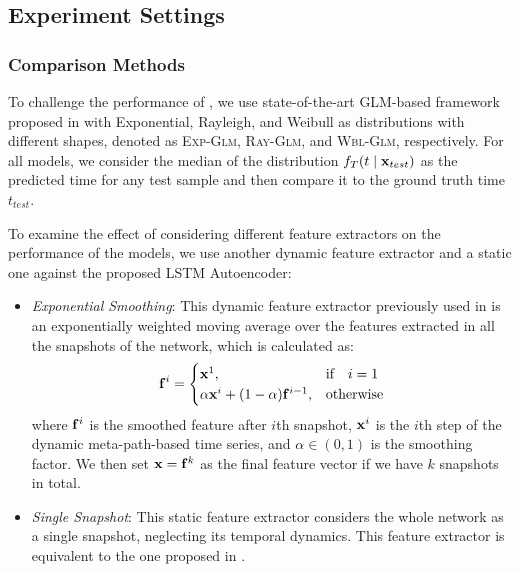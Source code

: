 \subsection{Experiment Settings}
\subsubsection{Comparison Methods}
To challenge the performance of \npglm, we use state-of-the-art GLM-based framework proposed in \cite{sun2012will} with Exponential, Rayleigh, and Weibull as distributions with different shapes, denoted as \textsc{Exp-Glm}, \textsc{Ray-Glm}, and \textsc{Wbl-Glm}, respectively. For all models, we consider the median of the distribution $f_T(t\mid\mathbf{x}_{test})$ as the predicted time for any test sample and then compare it to the ground truth time $t_{test}$.

To examine the effect of considering different feature extractors on the performance of the models, we use another dynamic feature extractor and a static one against the proposed LSTM Autoencoder:
\begin{itemize}
\item \emph{Exponential Smoothing}: This dynamic feature extractor previously used in \cite{hajibagheri2016leveraging} is an exponentially weighted moving average over the features extracted in all the snapshots of the network, which is calculated as:
\[\mathbf{f}^i=\begin{cases} 
\mathbf{x}^1, & \text{if}\quad i=1 \\
\alpha\mathbf{x}^i+(1-\alpha)\mathbf{f}^{i-1}, & \text{otherwise}
\end{cases}\]
where $\mathbf{f}^i$ is the smoothed feature after $i$th snapshot, $\mathbf{x}^i$ is the $i$th step of the dynamic meta-path-based time series, and $\alpha\in(0,1)$ is the smoothing factor. We then set $\mathbf{x}=\mathbf{f}^k$ as the final feature vector if we have $k$ snapshots in total.
\item \emph{Single Snapshot}: This static feature extractor considers the whole network as a single snapshot, neglecting its temporal dynamics. This feature extractor is equivalent to the one proposed in \cite{sun2012will}.
\end{itemize}

